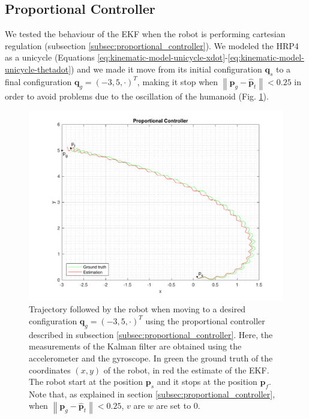 \documentclass[a4paper]{article}
\begin{document}
\subsection{Proportional Controller}
We tested the behaviour of the EKF when the robot is
performing cartesian regulation (subsection \ref{subsec:proportional_controller}).
We modeled the HRP4 as a unicycle (Equations
\ref{eq:kinematic-model-unicycle-xdot}-\ref{eq:kinematic-model-unicycle-thetadot})
and we made it move from its initial
configuration $\bm{q}_s$ to a final configuration $\bm{q}_g = (-3, 5, \cdot)^T$,
making it stop when $\left\|\bm{p}_g - \bm{\hat{p}}_t \right\| < 0.25$
in order to avoid problems due to
the oscillation of the humanoid (Fig. \ref{fig:proportional_controller_xy}).
\begin{figure}
    \centering
    \includegraphics[width=\textwidth]{images/proportional_controller}
    \caption{Trajectory followed by the robot when moving to a desired configuration
        $\bm{q}_g = (-3, 5, \cdot)^T$ using the proportional controller
        described in subsection \ref{subsec:proportional_controller}.
        Here, the measurements of the Kalman filter are obtained
        using the accelerometer and the gyroscope. In green the ground truth of the coordinates $(x, y)$ of the
        robot, in red the estimate of the EKF. The robot start at the
        position $\bm{p}_s$ and it stops at the position $\bm{p}_f$. Note that,
        as explained in section \ref{subsec:proportional_controller},
        when $\left\|\bm{p}_g - \bm{\hat{p}}_t \right\| < 0.25$, $v$ are $w$ are set to 0.}
    \label{fig:proportional_controller_xy}
\end{figure}
\end{document}
